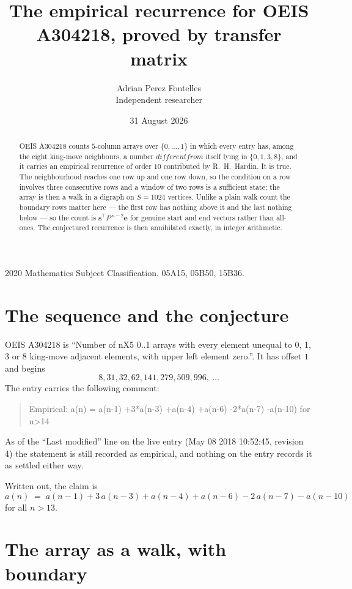 \documentclass[11pt,a4paper]{article}
\title{The empirical recurrence for OEIS A304218, proved by transfer matrix}
\author{Adrian Perez Fontelles\\ \small Independent researcher}
\date{31 August 2026}
\theoremstyle{plain}
\theoremstyle{definition}
\begin{document}
\maketitle

\begin{abstract}
OEIS A304218 counts $5$-column arrays over $\{0,\dots,1\}$ in which every entry has,
among the eight king-move neighbours, a number $different from$ itself lying in $\{0,1,3,8\}$, and it carries an empirical
recurrence of order $10$ contributed by R.~H.~Hardin. It is true. The neighbourhood
reaches one row up and one row down, so the condition on a row involves three consecutive
rows and a window of two rows is a sufficient state; the array is then a walk in a digraph
on $S=1024$ vertices. Unlike a plain walk count the boundary rows matter here --- the first
row has nothing above it and the last nothing below --- so the count is
$\mathbf{s}^{\!\top}P^{\,n-2}\mathbf{e}$ for genuine start and end vectors rather than
all-ones. The conjectured recurrence is then annihilated exactly, in integer arithmetic.
\end{abstract}

\noindent\small 2020 Mathematics Subject Classification. 05A15, 05B50, 15B36.\normalsize

\section{The sequence and the conjecture}

OEIS A304218 is ``Number of nX5 0..1 arrays with every element unequal to 0, 1, 3 or 8 king-move adjacent elements, with upper left element zero.''. It has offset
$1$ and begins
\[
8, 31, 32, 62, 141, 279, 509, 996,\ \dots
\]
The entry carries the following comment:
\begin{quote}\small
Empirical: a(n) = a(n-1) +3*a(n-3) +a(n-4) +a(n-6) -2*a(n-7) -a(n-10) for n>14
\end{quote}
As of the ``Last modified'' line on the live entry (May 08 2018 10:52:45, revision
4) the statement is still recorded as empirical, and nothing on the entry
records it as settled either way.

Written out, the claim is
\begin{equation}\label{eq:conj}
a(n)\;=\;a(n-1) + 3\,a(n-3) + a(n-4) + a(n-6) - 2\,a(n-7) - a(n-10)
\end{equation}
for all $n>13$.

\section{The array as a walk, with boundary}
\end{document}
